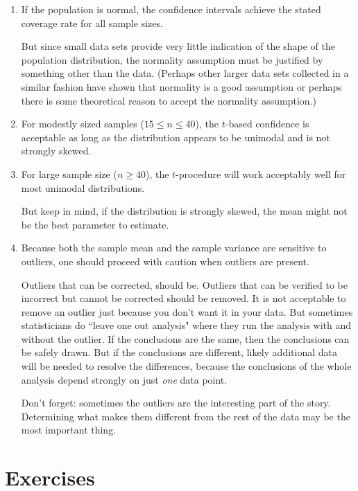 \documentclass[twoside]{book}\usepackage[]{graphicx}\usepackage[]{xcolor}
\begin{document}
\begin{enumerate}
	\item If the population is normal, the confidence intervals achieve
		the stated coverage rate for all sample sizes.

		But since small data sets provide very little indication
		of the shape of the population distribution, the normality assumption
		must be justified by something other than the data.
		(Perhaps other larger data sets collected in a similar fashion 
		have shown that normality is a good assumption or perhaps there
		is some theoretical reason to accept the normality assumption.)

	\item
		For modestly sized samples ($15 \le n \le 40$), the $t$-based 
		confidence is acceptable as long as the distribution appears 
		to be unimodal and is not strongly skewed.

	\item
		For large sample size ($n \ge 40$), the $t$-procedure will work acceptably
		well for most unimodal distributions.

		But keep in mind, if the distribution is strongly skewed, the 
		mean might not be the best parameter to estimate.

	\item
		Because both the sample mean and the sample variance are sensitive
		to outliers, one should proceed with caution when outliers 
		are present.

		Outliers that can be corrected, should be.  Outliers that can be verified
		to be incorrect but cannot be corrected should be removed.  It is not
		acceptable to remove an outlier just because you don't want it in your data.
		But sometimes statisticians do ``leave one out analysis" where they run the 
		analysis with and without the outlier.  If the conclusions are the same, then
		the conclusions can be safely drawn.  But if the conclusions are different,
		likely additional data will be needed to resolve the differences, because the conclusions of the whole analysis depend strongly on just \emph{one} data point.

		Don't forget: sometimes the outliers are the interesting part of the story.
		Determining what makes them different from the rest of the data may be 
		the most important thing.

\end{enumerate}



\newpage
\section*{Exercises}
\end{document}
